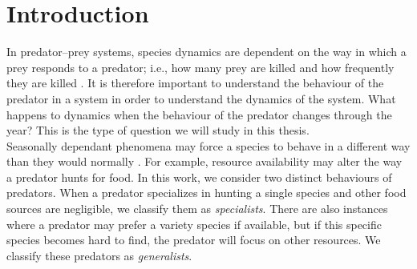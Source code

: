 \documentclass[12pt]{UOthesis}
\theoremstyle{remarkstyle}
\begin{document}
%

\cleardoublepage



\chapter{Introduction}
\label{ChapterIntroduction}

In predator--prey systems, species dynamics are dependent on the way in which a prey responds to a predator; i.e., how many prey are killed and how frequently they are killed \cite{FryxellLundberg, RosMac}. It is therefore important to understand the behaviour of the predator in a system in order to understand the dynamics of the system. What happens to dynamics when the behaviour of the predator changes through the year? This is the type of question we will study in this thesis.\\

Seasonally dependant phenomena may force a species to behave in a different way than they would normally \cite{BoyceSinclairWhite, NorrKorp}. For example, resource availability may alter the way a predator hunts for food. In this work, we consider two distinct behaviours of predators. When a predator specializes in hunting a single species and other food sources are negligible, we classify them as \textit{specialists}. There are also instances where a predator may prefer a variety species if available, but if this specific species becomes hard to find, the predator will focus on other resources. We classify these predators as \textit{generalists}.\\
\end{document}
